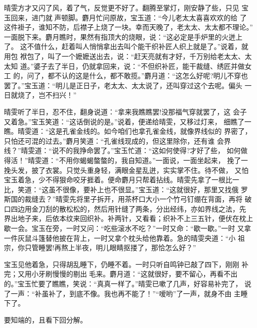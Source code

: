 晴雯方才又闪了风，着了气，反觉更不好了。翻腾至掌灯，刚安静了些，只见
宝玉回来，进门就声顿脚。麝月忙问原故，宝玉道：“今儿老太太喜喜欢欢的给
了这件褂子，谁知不防，后襟子上烧了一块。幸而天晚了，老太太、太太都不理论。”
一面脱下来。麝月瞧时，果然有指顶大的烧眼，说：“这必定是手炉里的火迸上了。
这不值什么，赶着叫人悄悄拿出去叫个能干织补匠人织上就是了。”说着，就用包
袱包了，叫了一个嬷嬷送出去，说：“赶天亮就有才好，千万别给老太太、太太知
道。”婆子去了半日，仍就拿回来，说：“不但织补匠，能干裁缝、绣匠并做女工
的，问了，都不认的这是什么，都不敢揽。”麝月道：“这怎么好呢?明儿不穿也
罢了。”宝玉道：“明儿是正日子，老太太、太太说了，还叫穿过这个去呢。偏头
一日就烧了，岂不扫兴！”

晴雯听了半日，忍不住，翻身说道：“拿来我瞧瞧罢!没那福气穿就罢了，这
会子又着急。”宝玉笑道：“这话倒说的是。”说着，便递给晴雯，又移过灯来，
细瞧了一瞧。晴雯道：“这是孔雀金线的。如今咱们也拿孔雀金线，就像界线似的
界密了，只怕还可混的过去。”麝月笑道：“孔雀线现成的，但这里除你，还有谁
会界线？”晴雯道：“说不的我挣命罢了。”宝玉忙道：“这如何使得?才好了些，
如何做得活！”晴雯道：“不用你蝎蝎螫螫的，我自知道。”一面说，一面坐起来，
挽了一挽头发，披了衣裳。只觉头重身轻，满眼金星乱迸，实实掌不住。待不做，
又怕宝玉着急，少不得狠命咬牙捱着。便命麝月只帮着拈线。晴雯先拿了一根比一
比，笑道：“这虽不很像，要补上也不很显。”宝玉道：“这就很好，那里又找俄
罗斯国的裁缝去？”晴雯先将里子拆开，用茶杯口大小一个竹弓钉绷在背面，再将
破口四边用金刀刮的散松松的，然后用针缝了两条，分出经纬，亦如界线之法，先
界出地子来，后依本纹来回织补。补两针，又看看；织补不上三五针，便伏在枕上
歇一会。宝玉在旁，一时又问：“吃些滚水不吃？”一时又命：“歇一歇。”一时
又拿一件灰鼠斗篷替他披在背上，一时又拿个枕头给他靠着。急的晴雯央道：“小
祖宗，你只管睡罢!再熬上半夜，明儿眼睛抠搂了，那恰怎么好？”

宝玉见他着急，只得胡乱睡下，仍睡不着。一时只听自鸣钟已敲了四下，刚刚
补完；又用小牙刷慢慢的剔出毛来。麝月道：“这就很好，要不留心，再看不出
的。”宝玉忙要了瞧瞧，笑说：“真真一样了。”晴雯已嗽了几声，好容易补完了，
说了一声：“补虽补了，到底不像。我也再不能了！”“嗳哟”了一声，就身不由
主睡下了。

要知端的，且看下回分解。